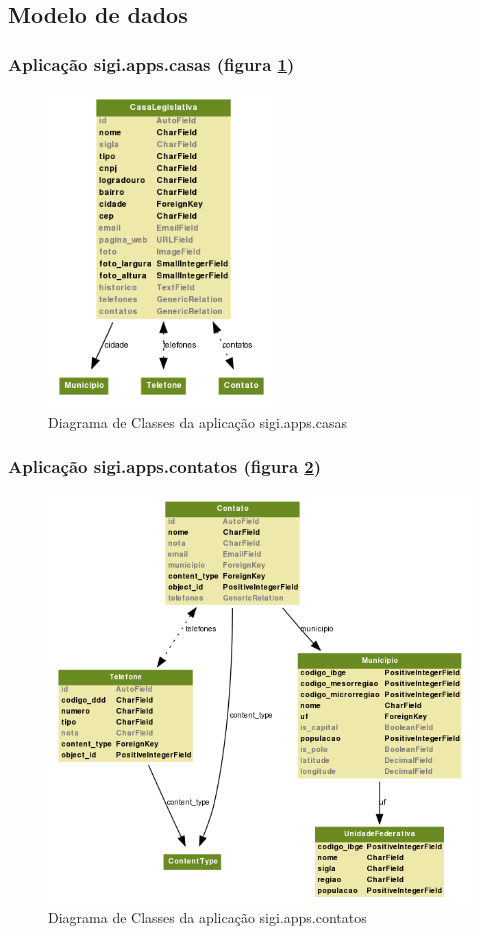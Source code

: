 \subsection{Modelo de dados}
\label{sec:modelo}

\subsubsection{Aplicação sigi.apps.casas (figura \ref{fig:casas})}
\begin{figure}[h!]
  \centering
  \includegraphics[width=60mm]{../imagens/casas.png}
  \caption{Diagrama de Classes da aplicação sigi.apps.casas}
  \label{fig:casas}
\end{figure}

\subsubsection{Aplicação sigi.apps.contatos (figura \ref{fig:contatos})}
\begin{figure}[h!]
  \centering
  \includegraphics[width=120mm]{../imagens/contatos.png}
  \caption{Diagrama de Classes da aplicação sigi.apps.contatos}
  \label{fig:contatos}
\end{figure}

